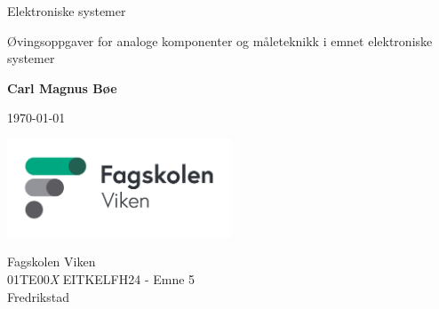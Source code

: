 \begin{titlepage}
    \begin{center}
    \vspace*{1cm}
    
    \Huge
	Elektroniske systemer
    
    \Large
    \vspace{0.5cm}
    Øvingsoppgaver for analoge komponenter og måleteknikk i emnet elektroniske systemer


   \vspace{1.5cm}
   \textbf{Carl Magnus Bøe}
    
    \today{}
	\vfill




    \includegraphics[width=0.5\textwidth]{frontmatter/bilder/r171JViZ6gmf8WXujFQw.jpg}
    
    \Large
    Fagskolen Viken\\
    01TE00\textit{X} EITKELFH24 - Emne 5\\
    Fredrikstad\\

    \end{center}
\end{titlepage}